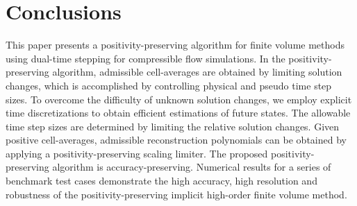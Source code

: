 
\section{Conclusions}
\label{sec:Conclusions}

This paper presents a positivity-preserving algorithm for finite volume methods using dual-time stepping for compressible flow simulations.
In the positivity-preserving algorithm, admissible cell-averages are obtained by limiting solution changes,
which is accomplished by controlling physical and pseudo time step sizes.
To overcome the difficulty of unknown solution changes,
we employ explicit time discretizations to obtain efficient estimations of future states.
The allowable time step sizes are determined by limiting the relative solution changes.
Given positive cell-averages,
admissible reconstruction polynomials can be obtained by applying a positivity-preserving scaling limiter.
The proposed positivity-preserving algorithm is accuracy-preserving.
Numerical results for a series of benchmark test cases demonstrate the high accuracy, high resolution and robustness of the positivity-preserving implicit high-order finite volume method.